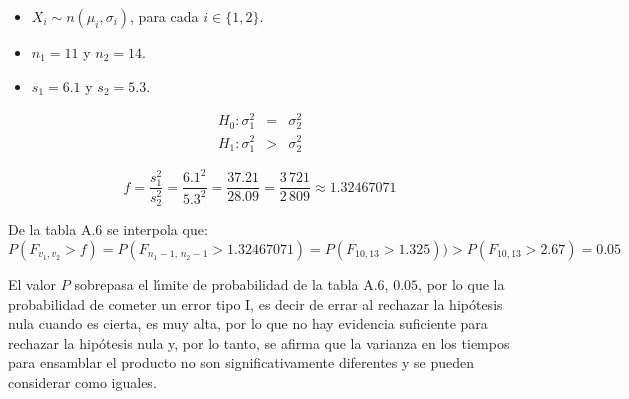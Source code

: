 \begin{solucion}
 \begin{datos}
  $\phantom{0}$
  \begin{itemize}
   \item $X_i \sim n\left( \mu_i, \sigma_i \right)$,
   para cada $i \in \{1,2\}$.
   \item $n_1 = 11$ y $n_2 = 14$.
   \item $s_1 = 6.1$ y $s_2 = 5.3$.
  \end{itemize}
 \end{datos}

 \begin{hipotesis}
  \begin{eqnarray*}
   H_0: \sigma_1^2 & = & \sigma_2^2 \\
   H_1: \sigma_1^2 & > & \sigma_2^2
  \end{eqnarray*}
 \end{hipotesis}

 \begin{estadistico}
  \begin{equation*}
   f = \frac{s_1^2}{s_2^2}
   = \frac{6.1^2}{5.3^2} = \frac{37.21}{28.09}
   = \frac{3\,721}{2\,809} \approx 1.32467071
  \end{equation*}
 \end{estadistico}

 \begin{valorp}
  De la tabla A.6 se interpola que:
  \begin{equation*}
   P(F_{v_1,v_2} > f) = P(F_{n_1-1,\,n_2-1} > 1.32467071)
   = P(F_{10,13} > 1.325)) > P(F_{10,13} > 2.67) = 0.05
  \end{equation*}
 \end{valorp}

 \begin{conclusion}
  El valor $P$ sobrepasa el l\'{\i}mite de probabilidad de la tabla A.6, $0.05$,
  por lo que la probabilidad de cometer un error tipo I,
  es decir de errar al rechazar la hip\'otesis nula cuando es cierta,
  es muy alta, por lo que no hay evidencia suficiente para rechazar
  la hip\'otesis nula y, por lo tanto, se afirma que la varianza en los tiempos
  para ensamblar el producto no son significativamente diferentes
  y se pueden considerar como iguales.
 \end{conclusion}
 

\end{solucion}
